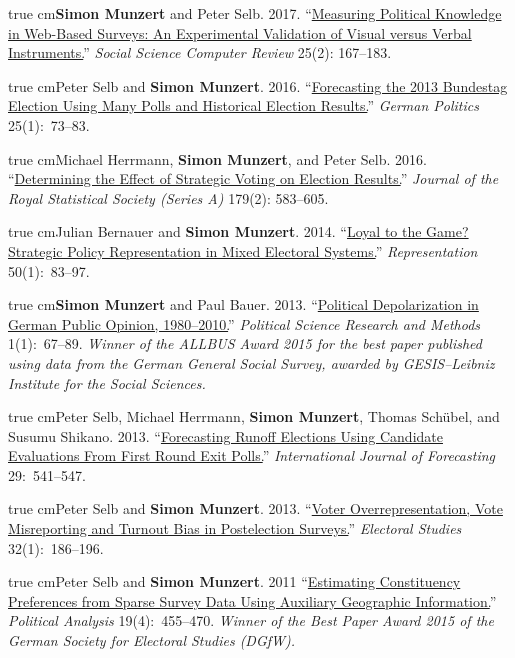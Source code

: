 \documentclass[11pt,article,oneside]{memoir}   %
\def\mybibind{\vspace{0.1in} \noindent \hangindent=1 true cm\hangafter=1}
\begin{document}
\mybibind  \textbf{Simon Munzert} and Peter Selb. 2017. ``\href{http://ssc.sagepub.com/content/early/2015/10/30/0894439315616325.abstract}{Measuring Political Knowledge in Web-Based Surveys: An Experimental Validation of Visual versus Verbal Instruments.}'' \emph{Social Science Computer Review} 25(2): 167--183.

\mybibind  Peter Selb and \textbf{Simon Munzert}. 2016. ``\href{http://www.tandfonline.com/doi/abs/10.1080/09644008.2015.1121454?journalCode=fgrp20}{Forecasting the 2013 Bundestag Election Using Many Polls and Historical Election Results.}'' \emph{German Politics} 25(1):~73--83.

\mybibind  Michael Herrmann, \textbf{Simon Munzert}, and Peter Selb. 2016. ``\href{http://onlinelibrary.wiley.com/doi/10.1111/rssa.12130/abstract}{Determining the Effect of Strategic Voting on Election Results.}'' \emph{Journal of the Royal Statistical Society (Series A)} 179(2): 583--605.

\mybibind  Julian Bernauer and \textbf{Simon Munzert}. 2014. ``\href{http://dx.doi.org/10.1080/00344893.2014.902221}{Loyal to the Game? Strategic Policy Representation in Mixed Electoral Systems.}'' \emph{Representation} 50(1):~83--97.

\mybibind  \textbf{Simon Munzert} and Paul Bauer. 2013. ``\href{http://journals.cambridge.org/action/displayAbstract?fromPage=online&aid=8936714}{Political Depolarization in German Public Opinion, 1980--2010.}'' \emph{Political Science Research and Methods} 1(1):~67--89. \emph{Winner of the ALLBUS Award 2015 for the best paper published using data from the German General Social Survey, awarded by GESIS--Leibniz Institute for the Social Sciences.}

\mybibind Peter Selb, Michael Herrmann, \textbf{Simon Munzert}, Thomas Sch\"ubel, and Susumu Shikano. 2013. ``\href{http://www.sciencedirect.com/science/article/pii/S0169207013000344}{Forecasting Runoff Elections Using Candidate Evaluations From First Round Exit Polls.}'' \emph{International Journal of Forecasting} 29:~541--547. 

\mybibind  Peter Selb and \textbf{Simon Munzert}. 2013. ``\href{http://www.sciencedirect.com/science/article/pii/S0261379412001369}{Voter Overrepresentation, Vote Misreporting and Turnout Bias in Postelection Surveys.}'' \emph{Electoral Studies} 32(1):~186--196.

\mybibind  Peter Selb and \textbf{Simon Munzert}. 2011 ``\href{http://pan.oxfordjournals.org/content/19/4/455.short}{Estimating Constituency Preferences from Sparse Survey Data Using Auxiliary Geographic Information.}'' \emph{Political Analysis} 19(4):~455--470. \emph{Winner of the Best Paper Award 2015 of the German Society for Electoral Studies (DGfW).}
\end{document}
